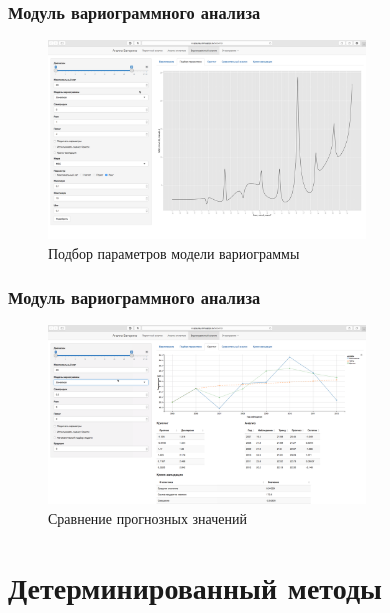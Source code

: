 \documentclass[10pt,pdf,aspectratio=169,hyperref={unicode}]{beamer}
\begin{document}
\begin{frame}
  \frametitle{Модуль вариограммного анализа}
    \begin{figure}[h]
    \includegraphics[width=0.75\textwidth]{../../figures/static/5_fit.png}
    \caption{Подбор параметров модели вариограммы}
  \end{figure}
\end{frame}

\begin{frame}
  \frametitle{Модуль вариограммного анализа}
    \begin{figure}[h]
    \includegraphics[width=0.75\textwidth]{../../figures/static/6_krige.png}
    \caption{Сравнение прогнозных значений}
  \end{figure}
\end{frame}

\section{Детерминированный методы}
\end{document}

